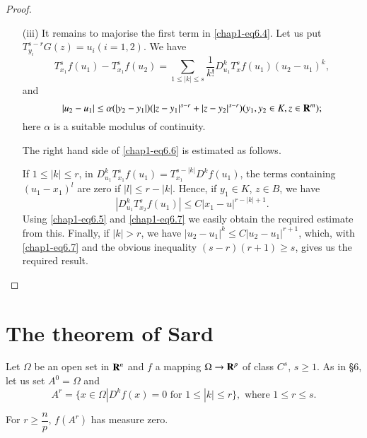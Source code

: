 \begin{proof}
\begin{itemize}
\item[(iii)] It remains to majorise the first term in \eqref{chap1-eq6.4}. Let us put $T^{s-r}_{y_{i}}G(z)=u_{i}(i=1,2)$. We have
\begin{equation}
T^{s}_{x_{1}}f(u_{1})-T^{s}_{x_{1}}f(u_{2})=\sum\limits_{1\leq |k|\leq s}\dfrac{1}{k!}D^{k}_{u_{1}}T^{s}_{x}f(u_{1})(u_{2}-u_{1})^{k},\label{chap1-eq6.6}
\end{equation}
and
\begin{equation}
|u_{2}-u_{1}|\leq \alpha(|y_{2}-y_{1}|)(|z-y_{1}|^{s-r}+|z-y_{2}|^{s-r})(y_{1},y_{2}\in K, z\in \mathbf{R}^{m});\label{chap1-eq6.7}
\end{equation}
here $\alpha$ is a suitable modulus of continuity.

The right hand side of \eqref{chap1-eq6.6} is estimated as follows.

If $1\leq |k|\leq r$, in $D^{k}_{u_{1}}T^{s}_{x_{1}}f(u_{1})=T^{s-|k|}_{x_{1}}D^{k}f(u_{1})$,
the terms containing $(u_{1}-x_{1})^{l}$ are zero if $|l|\leq r-|k|$. Hence, if $y_{1}\in K$, $z\in B$, we have
$$
|D^{k}_{u_{1}}T^{s}_{x_{2}}f(u_{1})|\leq C|x_{1}-u|^{r-|k|+1}.
$$
Using \eqref{chap1-eq6.5} and \eqref{chap1-eq6.7} we easily obtain the required estimate from this. Finally, if $|k|>r$, we have $|u_{2}-u_{1}|^{k}\leq C|u_{2}-u_{1}|^{r+1}$, which, with \eqref{chap1-eq6.7} and the obvious inequality $(s-r)(r+1)\geq s$, gives us the required result.
\end{itemize}
\end{proof}

\section{The theorem of Sard}\label{chap1-sec7}
\pageoriginale
Let $\Omega$ be an open set in $\mathbf{R}^{n}$ and $f$ a mapping $\Omega\to \mathbf{R}^{p}$ of class $C^{s}$, $s\geq 1$. As in \S6, let us set $A^{0}=\Omega$ and 
$$
A^{r}=\{x\in \Omega|D^{k}f(x)=0\text{ for } 1\leq |k|\leq r\}, \text{ where } 1\leq r\leq s.
$$

\begin{lemma}\label{chap1-lem7.1}
For $r\geq \dfrac{n}{p}$, $f(A^{r})$ has measure zero.
\end{lemma}

